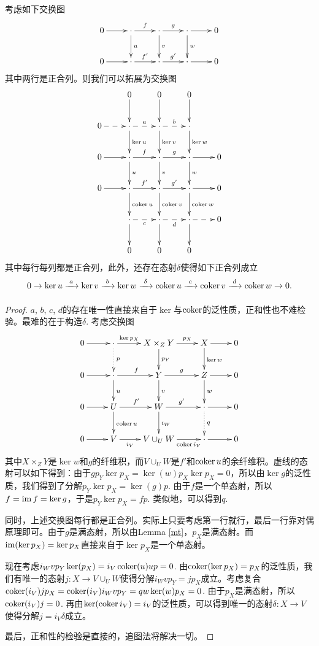 \begin{lem}[蛇引理]\label{snake-lemma}
考虑如下交换图
\[
	\xymatrix{
	0\ar[r]&\cdot \ar[r]^{f}\ar[d]^{u}&\cdot \ar[r]^{g}\ar[d]^{v}&\cdot \ar[r]\ar[d]^{w}&0\\
	0\ar[r]&\cdot \ar[r]^{f'}&\cdot \ar[r]^{g'}&\cdot \ar[r]&0\\
	}
\]
其中两行是正合列。则我们可以拓展为交换图
\[
	\xymatrix{
	&0\ar[d]&0\ar[d]&0\ar[d]&\\
	0\ar@{-->}[r]&\cdot\ar@{-->}[r]^a\ar[d]^{\ker u}&\cdot\ar@{-->}[r]^b\ar[d]^{\ker v}&\cdot\ar[d]^{\ker w}&\\
	0\ar[r]&\cdot \ar[r]^{f}\ar[d]^{u}&\cdot \ar[r]^{g}\ar[d]^{v}&\cdot \ar[r]\ar[d]^{w}&0\\
	0\ar[r]&\cdot \ar[r]^{f'}\ar[d]^{\coker u}&\cdot \ar[r]^{g'}\ar[d]^{\coker v}&\cdot \ar[r]\ar[d]^{\coker w}&0\\
	&\cdot \ar@{-->}[r]_c\ar[d] &\cdot \ar@{-->}[r]_d\ar[d] &\cdot \ar@{-->}[r]\ar[d]& 0\\
	&0&0&0&\\
	}
\]
其中每行每列都是正合列，此外，还存在态射$\delta$使得如下正合列成立
\[
	0\to \ker u \xrightarrow[~~~]{a}\ker v \xrightarrow[~~~]{b}\ker w \xrightarrow[~~~]{\delta}\operatorname{coker} u \xrightarrow[~~~]{c}\operatorname{coker} v \xrightarrow[~~~]{d}\operatorname{coker} w \to 0.
\]
\end{lem}

\begin{proof}
$a$, $b$, $c$, $d$的存在唯一性直接来自于$\ker$与$\operatorname{coker}$的泛性质，正和性也不难检验。最难的在于构造$\delta$. 考虑交换图
\[
	\xymatrix{
	0\ar[r]&\cdot \ar[r]^-{\ker p_X}\ar@{.>}[d]^p&X\times_Z Y \ar[r]^-{p_X}\ar[d]^{p_Y}&X\ar[d]^{\ker w}\ar[r]&0\\
	0\ar[r]&\cdot \ar[r]^{f}\ar[d]^{u}&Y \ar[r]^{g}\ar[d]^{v}&Z \ar[d]^{w}\ar[r]&0\\
	0\ar[r]&U \ar[r]^{f'}\ar[d]^{\coker u}&W \ar[r]^{g'}\ar[d]^{i_W}&\cdot \ar@{.>}[d]^q\ar[r]&0\\
	0\ar[r]&V \ar[r]_-{i_V}&V\cup_U W \ar[r]_-{\coker i_V}&\cdot\ar[r]&0
	}
\]
其中$X\times_Z Y$是$\ker w$和$g$的纤维积，而$V\cup_U W$是$f'$和$\operatorname{coker} u$的余纤维积。虚线的态射可以如下得到：由于$gp_Y \ker p_X=\ker(w)p_X\ker p_X=0$，所以由$\ker g$的泛性质，我们得到了分解$p_Y\ker p_X=\ker(g)p$. 由于$f$是一个单态射，所以$f=\operatorname{im} f=\ker g$，于是$p_Y\ker p_X=fp$. 类似地，可以得到$q$.

同时，上述交换图每行都是正合列。实际上只要考虑第一行就行，最后一行靠对偶原理即可。由于$g$是满态射，所以由Lemma \ref{mt}，$p_X$是满态射。而$\operatorname{im}(\ker p_X)=\ker p_X$直接来自于$\ker p_X$是一个单态射。

现在考虑$i_Wvp_Y\ker(p_X)=i_V\operatorname{coker}(u)up=0$. 由$\operatorname{coker}(\ker p_X)=p_X$的泛性质，我们有唯一的态射$j:X\to V\cup_U W$使得分解$i_Wvp_Y=jp_X$成立。考虑复合$\operatorname{coker}(i_V)jp_X=\operatorname{coker}(i_V)i_Wvp_Y=qw\ker(w)p_X=0$. 由于$p_X$是满态射，所以$\operatorname{coker}(i_V)j=0$. 再由$\ker(\operatorname{coker} i_V)=i_V$的泛性质，可以得到唯一的态射$\delta:X\to V$使得分解$j=i_V \delta$成立。

最后，正和性的检验是直接的，追图法将解决一切。
\end{proof}

